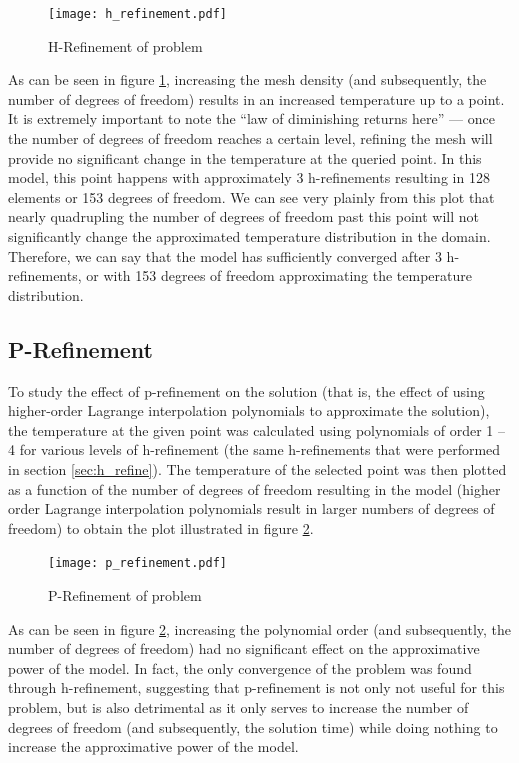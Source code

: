 \documentclass[letterpaper,10pt]{article}
\begin{document}
\begin{figure}[H]
	\centering
	\texttt{[image: h\_refinement.pdf]}
	\caption{H-Refinement of problem}
	\label{fig:h_refinement}
\end{figure}

As can be seen in figure \ref{fig:h_refinement}, increasing the mesh density (and subsequently, the number of degrees of freedom) results in an increased temperature up to a point. It is extremely important to note the ``law of diminishing returns here'' --- once the number of degrees of freedom reaches a certain level, refining the mesh will provide no significant change in the temperature at the queried point. In this model, this point happens with approximately 3 h-refinements resulting in 128 elements or 153 degrees of freedom. We can see very plainly from this plot that nearly quadrupling the number of degrees of freedom past this point will not significantly change the approximated temperature distribution in the domain. Therefore, we can say that the model has sufficiently converged after 3 h-refinements, or with 153 degrees of freedom approximating the temperature distribution.

\subsection{P-Refinement}
To study the effect of p-refinement on the solution (that is, the effect of using higher-order Lagrange interpolation polynomials to approximate the solution), the temperature at the given point was calculated using polynomials of order 1 -- 4 for various levels of h-refinement (the same h-refinements that were performed in section \ref{sec:h_refine}). The temperature of the selected point was then plotted as a function of the number of degrees of freedom resulting in the model (higher order Lagrange interpolation polynomials result in larger numbers of degrees of freedom) to obtain the plot illustrated in figure \ref{fig:p_refinement}.

\begin{figure}[H]
	\centering
	\texttt{[image: p\_refinement.pdf]}
	\caption{P-Refinement of problem}
	\label{fig:p_refinement}
\end{figure}

As can be seen in figure \ref{fig:p_refinement}, increasing the polynomial order (and subsequently, the number of degrees of freedom) had no significant effect on the approximative power of the model. In fact, the only convergence of the problem was found through h-refinement, suggesting that p-refinement is not only not useful for this problem, but is also detrimental as it only serves to increase the number of degrees of freedom (and subsequently, the solution time) while doing nothing to increase the approximative power of the model.
\end{document}

